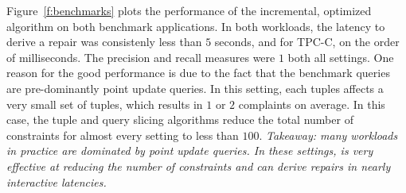 Figure~\ref{f:benchmarks} plots the performance of the incremental, optimized \sys algorithm
on both benchmark applications.  In both workloads, the latency to derive a repair was consistenly less
than $5$ seconds, and for TPC-C, on the order of milliseconds.  The precision and recall measures were
$1$ both all settings.   One reason for the good performance is due to the fact that the benchmark queries
are pre-dominantly point update queries.  In this setting, each tuples affects a very small set of 
tuples, which results in $1$ or $2$ complaints on average.  In this case, the tuple and query slicing algorithms
reduce the total number of constraints for almost every setting to less than $100$.  
{\it Takeaway: many workloads in practice are dominated by point update queries.  In these settings,
 \sys is very effective at reducing the number of constraints and can derive repairs in nearly
 interactive latencies.}






